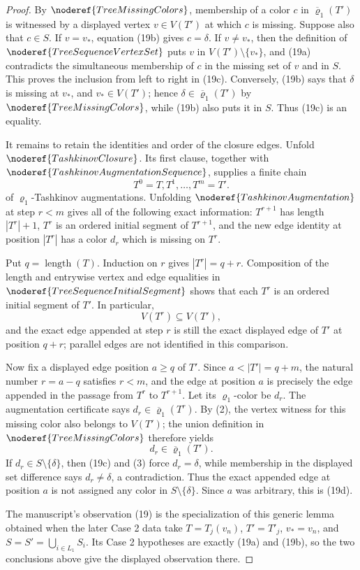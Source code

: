 \begin{proof}
By \(\noderef{TreeMissingColors}\), membership of a color \(c\) in
\(\overline{\varrho}_1(T')\) is witnessed by a displayed vertex
\(v\in V(T')\) at which \(c\) is missing.  Suppose also that \(c\in S\).
If \(v=v_*\), equation (19b) gives \(c=\delta\).  If \(v\ne v_*\),
then the definition of \(\noderef{TreeSequenceVertexSet}\) puts \(v\) in
\(V(T')\setminus\{v_*\}\), and (19a) contradicts the simultaneous
membership of \(c\) in the missing set of \(v\) and in \(S\).  This proves
the inclusion from left to right in (19c).  Conversely, (19b) says that
\(\delta\) is missing at \(v_*\), and \(v_*\in V(T')\); hence
\(\delta\in\overline{\varrho}_1(T')\) by
\(\noderef{TreeMissingColors}\), while (19b) also puts it in \(S\).
Thus (19c) is an equality.

It remains to retain the identities and order of the closure edges.
Unfold \(\noderef{TashkinovClosure}\).  Its first clause, together with
\(\noderef{TashkinovAugmentationSequence}\), supplies a finite chain
\[
                         T^0=T,T^1,\ldots,T^m=T'.             \tag{1}
\]
of \(\varrho_1\)-Tashkinov augmentations.  Unfolding
\(\noderef{TashkinovAugmentation}\) at step \(r<m\) gives all of the
following exact information: \(T^{r+1}\) has length
\(|T^r|+1\), \(T^r\) is an ordered initial segment of \(T^{r+1}\), and
the new edge identity at position \(|T^r|\) has a color \(d_r\) which is
missing on \(T^r\).

Put \(q=\operatorname{length}(T)\).  Induction on \(r\) gives
\(|T^r|=q+r\).  Composition of the length and
entrywise vertex and edge equalities in
\(\noderef{TreeSequenceInitialSegment}\) shows that each \(T^r\) is an
ordered initial segment of \(T'\).  In particular,
\[
                         V(T^r)\subseteq V(T'),               \tag{2}
\]
and the exact edge appended at step \(r\) is still the exact displayed
edge of \(T'\) at position \(q+r\); parallel edges are not identified
in this comparison.

Now fix a displayed edge position \(a\ge q\) of \(T'\).  Since
\(a<|T'|=q+m\), the natural number \(r=a-q\) satisfies \(r<m\), and
the edge at position \(a\) is precisely the edge appended in the passage
from \(T^r\) to \(T^{r+1}\).  Let its \(\varrho_1\)-color be \(d_r\).
The augmentation certificate says
\(d_r\in\overline{\varrho}_1(T^r)\).  By (2), the vertex witness for
this missing color also belongs to \(V(T')\); the union definition in
\(\noderef{TreeMissingColors}\) therefore yields
\[
                         d_r\in\overline{\varrho}_1(T').      \tag{3}
\]
If \(d_r\in S\setminus\{\delta\}\), then (19c) and (3) force
\(d_r=\delta\), while membership in the displayed set difference says
\(d_r\ne\delta\), a contradiction.  Thus the exact appended edge at
position \(a\) is not assigned any color in \(S\setminus\{\delta\}\).
Since \(a\) was arbitrary, this is (19d).

The manuscript's observation (19) is the specialization of this generic
lemma obtained when the later Case 2 data take
\(T=T_j(v_n)\), \(T'=T'_j\), \(v_*=v_n\), and
\(S=S'=\bigcup_{i\in L_1}S_i\).  Its Case 2 hypotheses are exactly
(19a) and (19b), so the two conclusions above give the displayed
observation there.
\end{proof}
